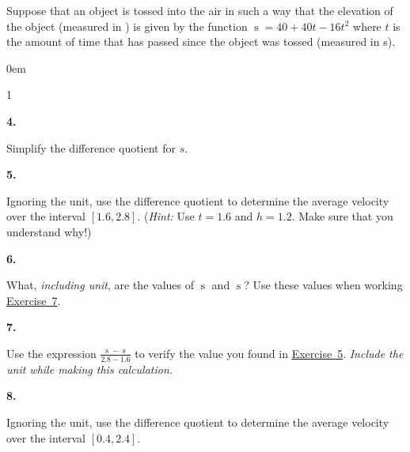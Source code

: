 \documentclass[12pt,]{book}
\theoremstyle{plain}
\theoremstyle{definition}
\numberwithin{equation}{section}
\newenvironment{exercisegroup}%
{\medskip\noindent}%
{\par\bigskip}%
\newlength{\exercisegroupindent}%
\newlength{\exercisegroupitemwidth}%
\newenvironment{exercisegrouplist}%
{\vspace{-\partopsep}%
\begin{adjustwidth}{\exercisegroupindent}{0em}}%
{\end{adjustwidth}%
\vspace{-\partopsep}%
\vspace{\baselineskip}}%
\newenvironment{exercisegroupbycol}[1]%
{\begin{exercisegrouplist}%
\vspace{-\multicolsep}%
\begin{multicols}{#1}%
\setlength{\parindent}{0em}%
\setlength{\exercisegroupitemwidth}{\linewidth}}%
{\end{multicols}%
\vspace{-\multicolsep}%
\end{exercisegrouplist}}%
\newenvironment{exercisegroupitem}[1]%
{\begin{minipage}[t]{\exercisegroupitemwidth}
\vspace{0pt}%
{\bfseries#1}%
\rule{0pt}{\baselineskip}}{\strut%
\end{minipage}%
\hspace{\columnsep}}%
\providecommand\phantomsection{}
\newcommand{\fe}[2]{\mathop{{#1}{\left(#2\right)}}}
\newcommand{\cinterval}[2]{\left[#1,#2\right]}
\begin{document}
\begin{exercisegroup}%
Suppose that an object is tossed into the air in such a way that the elevation of the object (measured in \si{\foot}) is given by the function \(\fe{s}{t}=40+40t-16t^2\) where \(t\) is the amount of time that has passed since the object was tossed (measured in \si{\second}).%
\begin{exercisegroupbycol}{1}%
\begin{exercisegroupitem}{4. }\phantomsection\hypertarget{exercise-12}{\null}
Simplify the difference quotient for \(s\).%
\end{exercisegroupitem}%
\par%
\begin{exercisegroupitem}{5. }\phantomsection\hypertarget{exercise-difference-quotient-average-velocity}{\null}
Ignoring the unit, use the difference quotient to determine the average velocity over the interval \(\cinterval{1.6}{2.8}\). (\emph{Hint:} Use \(t=1.6\) and \(h=1.2\). Make sure that you understand why!)%
\end{exercisegroupitem}%
\par%
\begin{exercisegroupitem}{6. }\phantomsection\hypertarget{exercise-14}{\null}
What, \emph{including unit}, are the values of \(\fe{s}{1.6}\) and \(\fe{s}{2.8}\)? Use these values when working \hyperref[exercise-difference-quotient-verify]{Exercise~7}.%
\end{exercisegroupitem}%
\par%
\begin{exercisegroupitem}{7. }\phantomsection\hypertarget{exercise-difference-quotient-verify}{\null}
Use the expression \(\frac{\fe{s}{2.8}-\fe{s}{1.6}}{2.8-1.6}\) to verify the value you found in \hyperref[exercise-difference-quotient-average-velocity]{Exercise~5}. \emph{Include the unit while making this calculation.}%
\end{exercisegroupitem}%
\par%
\begin{exercisegroupitem}{8. }\phantomsection\hypertarget{exercise-16}{\null}
Ignoring the unit, use the difference quotient to determine the average velocity over the interval \(\cinterval{0.4}{2.4}\).%
\end{exercisegroupitem}%
\par%
\end{exercisegroupbycol}%
\end{exercisegroup}%
\end{document}
